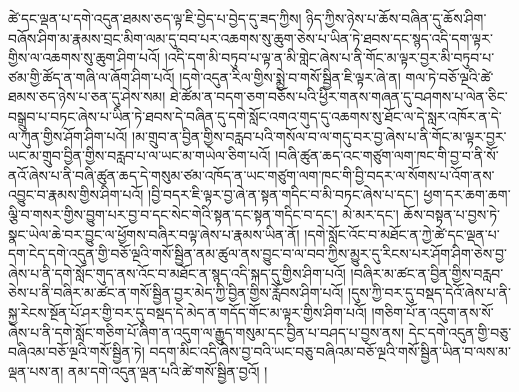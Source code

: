 ཚེ་དང་ལྡན་པ་དགེ་འདུན་ཐམས་ཅད་ལྟ་ཇི་བྱེད་པ་བྱེད་དུ་ཟད་ཀྱིས། ཉིད་ཀྱིས་ཉེས་པ་ཆོས་བཞིན་དུ་ཆོས་ཤིག་བཞོས་ཤིག་མ་རྣམས་བྲང་མིག་ལམ་དུ་བབ་པར་འཆགས་སུ་ཆུག་ཅེས་པ་ཡིན་ཏེ་ཐབས་དང་སྙད་འདི་དག་ལྟར་གྱིས་ལ་འཆགས་སུ་ཆུག་ཤིག་པའོ། །འདི་དག་མི་བཏུབ་པ་ལྟ་ན་མི་གླེང་ཞེས་པ་ནི་གོང་མ་ལྟར་བྱར་མི་བཏུབ་པ་ཙམ་གྱི་ཚོད་ན་གཞི་ལ་ཞོག་ཤིག་པའོ། །དགེ་འདུན་རིལ་གྱིས་སྨྱེ་བ་གསོ་སྦྱིན་ཇི་ལྟར་ཞེ་ན། གལ་ཏེ་བཅོ་ལྔའི་ཚེ་ཐམས་ཅད་ཉེས་པ་ཅན་དུ་ཤེས་སམ། ཐེ་ཚོམ་ན་བདག་ཅག་བཅོས་པའི་ཕྱིར་གནས་གཞན་དུ་བཤགས་པ་ལེན་ཅིང་བསྒྲུབ་པ་བཏང་ཞེས་པ་ཡིན་ཏེ་ཐབས་དེ་བཞིན་དུ་དགེ་སློང་འགའ་གུད་དུ་འཆགས་སུ་ཐོང་ལ་དེ་སླར་འཁོར་ན་དེ་ལ་ཀུན་གྱིས་ཤོག་ཤིག་པའོ། །མ་གྲུབ་ན་བྱིན་གྱིས་བརླབ་པའི་གསོལ་བ་ལ་གདུ་བར་བྱ་ཞེས་པ་ནི་གོང་མ་ལྟར་བྱར་ཡང་མ་གྲུབ་བྱིན་གྱིས་བརླབ་པ་ལ་ཡང་མ་གཡེལ་ཅིག་པའོ། །བཞི་ཚུན་ཆད་འང་གཙུག་ལག་ཁང་གི་བྱ་བ་ནི་སོ་ནའོ་ཞེས་པ་ནི་བཞི་ཚུན་ཆད་དེ་གསུམ་ཙམ་འཁོད་ན་ཡང་གཙུག་ལག་ཁང་གི་བྱི་བདར་ལ་སོགས་པ་འོག་ནས་འབྱུང་བ་རྣམས་གྱིས་ཤིག་པའོ། །བྱི་བདར་ཇི་ལྟར་བྱ་ཞེ་ན་སྟན་གདིང་བ་མི་བཏང་ཞེས་པ་དང་། ཕྱག་དར་ཆག་ཆག་ལྕི་བ་གསར་གྱིས་བྱུག་པར་བྱ་བ་དང་སེང་གེའི་སྟན་དང་སྟན་གདིང་བ་དང་། མེ་མར་དང་། ཆོས་བསྟན་པ་བྱས་ཏེ་སྣང་ཡེལ་ཆེ་བར་བྱུང་ལ་ཕྱོགས་བཞིར་བལྟ་ཞེས་པ་རྣམས་ཡིན་ནོ། །དགེ་སློང་འོང་བ་མཐོང་ན་ཀྱེ་ཚེ་དང་ལྡན་པ་དག་ངེད་དགེ་འདུན་གྱི་བཅོ་ལྔའི་གསོ་སྦྱིན་ནམ་ཚུལ་ནས་བྱུང་བ་ལ་བབ་ཀྱིས་མྱུར་དུ་རིངས་པར་ཤོག་ཤིག་ཅེས་བྱ་ཞེས་པ་ནི་དགེ་སློང་གུད་ནས་འོང་བ་མཐོང་ན་སྙད་འདི་སྐད་དུ་གྱིས་ཤིག་པའོ། །བཞིར་མ་ཚང་ན་བྱིན་གྱིས་བརླབ་ཅེས་པ་ནི་བཞིར་མ་ཚང་ན་གསོ་སྦྱིན་བྱར་མེད་ཀྱི་བྱིན་གྱིས་རློབས་ཤིག་པའོ། །དུས་ཀྱི་བར་དུ་བསྡད་དེའོ་ཞེས་པ་ནི་སྐྱ་རེངས་སྔོན་པོ་ཤར་གྱི་བར་དུ་བསྡད་དེ་མེད་ན་གདོད་གོང་མ་ལྟར་གྱིས་ཤིག་པའོ། །གཅིག་པོ་ན་འདུག་ནས་སོ་ཞེས་པ་ནི་དགེ་སློང་གཅིག་པོ་ཞིག་ན་འདུག་ལ་རྒྱུད་གསུམ་དང་བྱིན་པ་བཤད་པ་བྱས་ནས། དེང་དགེ་འདུན་གྱི་བཅུ་བཞིའམ་བཅོ་ལྔའི་གསོ་སྦྱིན་ཏེ། བདག་མིང་འདི་ཞེས་བྱ་བའི་ཡང་བཅུ་བཞིའམ་བཅོ་ལྔའི་གསོ་སྦྱིན་ཡིན་བ་ལས་མ་ལྡན་པས་ན། ནམ་དགེ་འདུན་ལྡན་པའི་ཚེ་གསོ་སྦྱིན་བྱའོ། །
